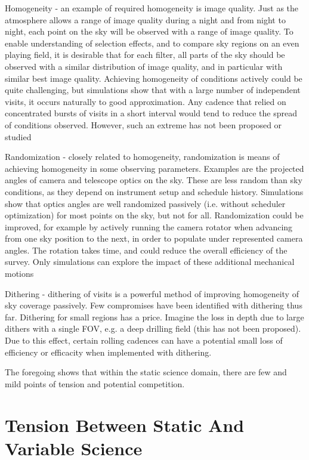 Homogeneity - an  example of required homogeneity is image quality.
Just as the atmosphere allows a range of image quality during a night
and from night to night, each point on the sky will be observed with a
range of image quality.  To enable understanding of selection effects,
and to compare sky regions on an even playing field, it is desirable
that for each filter, all parts of the sky should be observed with a
similar distribution of image quality, and in particular with similar
best image quality. Achieving homogeneity of conditions actively could
be quite challenging, but simulations show that with a large number of
independent visits, it occurs naturally to good approximation.  Any
cadence that relied on concentrated bursts of visits in a short interval
would tend to reduce the spread of conditions observed. However, such an
extreme has not been proposed or studied

Randomization - closely related to homogeneity, randomization is means
of achieving homogeneity in some observing parameters.  Examples are the
projected angles of camera and telescope optics on the sky. These are
less random than sky conditions, as they depend on instrument setup and
schedule history.  Simulations show that optics angles are well
randomized passively (i.e. without scheduler optimization) for most
points on the sky, but not for all.  Randomization could be improved,
for example by actively running the camera rotator when advancing from
one sky position to the next, in order to populate under represented
camera angles. The rotation takes time, and could reduce the overall
efficiency of the survey.  Only simulations can explore the impact of
these additional mechanical motions

Dithering - dithering of visits is a powerful method of improving
homogeneity of sky coverage passively. Few compromises have been
identified with dithering thus far.  Dithering for small regions has a
price. Imagine the loss in depth due to large dithers with a single FOV,
e.g. a deep drilling field (this has not been proposed).  Due to this
effect, certain rolling cadences can have a potential small loss of
efficiency or efficacity when implemented with dithering.

The foregoing shows that within the static science domain, there are few
and mild points of tension and potential competition.


\section{Tension Between Static And Variable Science}

